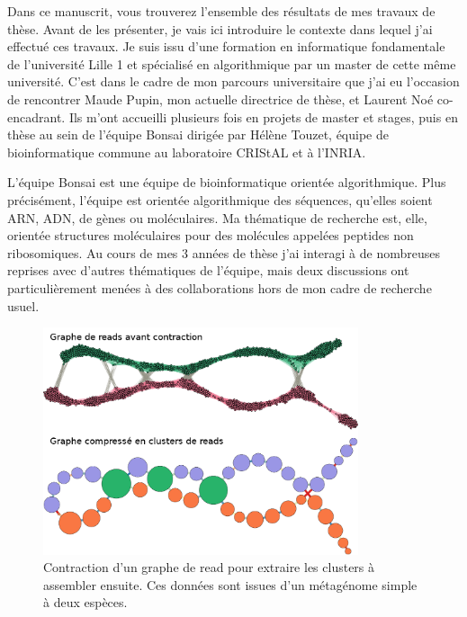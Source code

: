 Dans ce manuscrit, vous trouverez l'ensemble des résultats de mes travaux de thèse.
Avant de les présenter, je vais ici introduire le contexte dans lequel j'ai effectué ces travaux.
Je suis issu d'une formation en informatique fondamentale de l'université Lille 1 et spécialisé en algorithmique par un master de cette même université.
C'est dans le cadre de mon parcours universitaire que j'ai eu l'occasion de rencontrer Maude Pupin, mon actuelle directrice de thèse, et Laurent Noé co-encadrant.
Ils m'ont accueilli plusieurs fois en projets de master et stages, puis en thèse au sein de l'équipe Bonsai dirigée par Hélène Touzet, équipe de bioinformatique commune au laboratoire CRIStAL et à l'INRIA.

L'équipe Bonsai est une équipe de bioinformatique orientée algorithmique.
Plus précisément, l'équipe est orientée algorithmique des séquences, qu'elles soient ARN, ADN, de gènes ou moléculaires.
Ma thématique de recherche est, elle, orientée structures moléculaires pour des molécules appelées peptides non ribosomiques.
Au cours de mes 3 années de thèse j'ai interagi à de nombreuses reprises avec d'autres thématiques de l'équipe, mais deux discussions ont particulièrement menées à des collaborations hors de mon cadre de recherche usuel.

\begin{figure}[!ht]
  \begin{center}
    \includegraphics[width=350px]{Figures/preambule/pierre.png}
    \caption{\label{pierre}Contraction d'un graphe de read pour extraire les clusters à assembler ensuite.
    Ces données sont issues d'un métagénome simple à deux espèces.}
  \end{center}
\end{figure}

